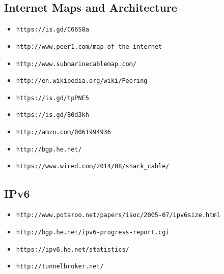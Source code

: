 \documentclass[xga]{xdvislides}
\begin{document}
\subsection{Internet Maps and Architecture}
\begin{itemize}
	\item \verb+https://is.gd/C66S8a+
	\item \verb+http://www.peer1.com/map-of-the-internet+
	\item \verb+http://www.submarinecablemap.com/+
	\item \verb+http://en.wikipedia.org/wiki/Peering+
	\item \verb+https://is.gd/tpPNE5+
	\item \verb+https://is.gd/B0d3kh+
	\item \verb+http://amzn.com/0061994936+
	\item \verb+http://bgp.he.net/+
	\item \verb+https://www.wired.com/2014/08/shark_cable/+
\end{itemize}

\subsection{IPv6}
\begin{itemize}
	\item \verb+http://www.potaroo.net/papers/isoc/2005-07/ipv6size.html+
	\item \verb+http://bgp.he.net/ipv6-progress-report.cgi+
	\item \verb+https://ipv6.he.net/statistics/+
	\item \verb+http://tunnelbroker.net/+
\end{itemize}

%
\end{document}
